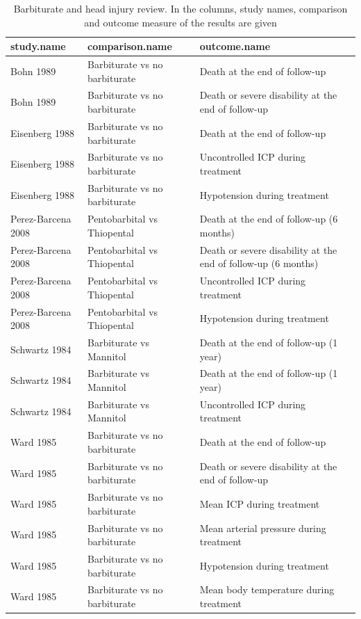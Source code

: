 \documentclass[11pt,a4paper,twoside]{book}\usepackage[]{graphicx}\usepackage[]{color}
\begin{document}
\begin{table}[ht]
\centering
\begingroup\footnotesize
\begin{tabular}{lll}
  \hline
study.name & comparison.name & outcome.name \\ 
  \hline
Bohn 1989 & Barbiturate vs no barbiturate & Death at the end of follow-up \\ 
  Bohn 1989 & Barbiturate vs no barbiturate & Death or severe disability at the end of follow-up \\ 
  Eisenberg 1988 & Barbiturate vs no barbiturate & Death at the end of follow-up \\ 
  Eisenberg 1988 & Barbiturate vs no barbiturate & Uncontrolled ICP during treatment \\ 
  Eisenberg 1988 & Barbiturate vs no barbiturate & Hypotension during treatment \\ 
  Perez-Barcena 2008 & Pentobarbital vs Thiopental & Death at the end of follow-up (6 months) \\ 
  Perez-Barcena 2008 & Pentobarbital vs Thiopental & Death or severe disability at the end of follow-up (6 months) \\ 
  Perez-Barcena 2008 & Pentobarbital vs Thiopental & Uncontrolled ICP during treatment \\ 
  Perez-Barcena 2008 & Pentobarbital vs Thiopental & Hypotension during treatment \\ 
  Schwartz 1984 & Barbiturate vs Mannitol & Death at the end of follow-up (1 year) \\ 
  Schwartz 1984 & Barbiturate vs Mannitol & Death at the end of follow-up (1 year) \\ 
  Schwartz 1984 & Barbiturate vs Mannitol & Uncontrolled ICP during treatment \\ 
  Ward 1985 & Barbiturate vs no barbiturate & Death at the end of follow-up \\ 
  Ward 1985 & Barbiturate vs no barbiturate & Death or severe disability at the end of follow-up \\ 
  Ward 1985 & Barbiturate vs no barbiturate & Mean ICP during treatment \\ 
  Ward 1985 & Barbiturate vs no barbiturate & Mean arterial pressure during treatment \\ 
  Ward 1985 & Barbiturate vs no barbiturate & Hypotension during treatment \\ 
  Ward 1985 & Barbiturate vs no barbiturate & Mean body temperature during treatment \\ 
   \hline
\end{tabular}
\endgroup
\caption{Barbiturate and head injury review. In the columns, study names, comparison and outcome measure of the results are given} 
\label{barbiturates}
\end{table}
\end{document}

